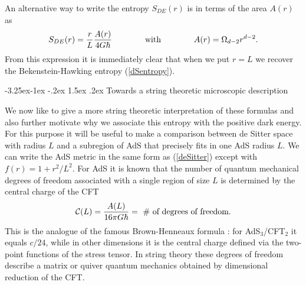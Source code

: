 \documentclass[a4paper,12pt]{article}
\makeatletter
\renewcommand\subsection{\@startsection{subsection}{2}{\z@}%
                                     {-3.25ex\@plus -1ex \@minus -.2ex}%
                                     {1.5ex \@plus .2ex}%
                                     {\normalfont\bfseries}}
\newcommand{\be}{\begin{equation}}
\newcommand{\ee}{\end{equation}}
\makeatother
\begin{document}
An alternative way to write the entropy $S_{DE}(r)$ is in terms of the area $A(r)$ as\\[-2mm]
\begin{equation}
\label{Svol}
S_{DE}(r) %
= 
{r\over L} {A(r)\over 4G\hbar}  \qquad \qquad \mbox{with} \qquad\qquad  A(r) = \Omega_{d-2} r^{d-2}  . 	
\end{equation}
From this expression it is immediately clear that when we put $r=L$ we recover the Bekenstein-Hawking entropy (\ref{dSentropy}). 



 



\subsection{Towards a string theoretic microscopic description} 

\label{subsec:towardsstring}

We now like to give a more string theoretic interpretation of these formulas and also further motivate why we associate this entropy with the positive dark energy.  For this purpose it will be useful to make a comparison between de Sitter space with radius $L$ and a subregion of AdS that precisely fits in one AdS radius $L$.  
We can write the AdS metric in the same form as (\ref{deSitter})
except with $f(r) =1+ r^2/L^2.$
For AdS it is known \cite{AdS-CFT,  SusskindWitten} that the number of quantum 
mechanical degrees of freedom associated with a single region of size $L$ is determined by the central charge of the CFT  %
\be
{\cal C}(L) = {A(L)\over 16\pi G\hbar} = \ \mbox{\# of degrees of freedom}.
\ee
This is the analogue of the famous Brown-Henneaux formula 
\cite{Brown-Henneaux}: for AdS$_3$/CFT$_2$ it equals $c/24$, while in other dimensions it is 
the central charge defined via the two-point functions of the stress tensor. In string theory these degrees of freedom describe a matrix or quiver quantum mechanics 
obtained by dimensional reduction of the CFT. 
\end{document}
